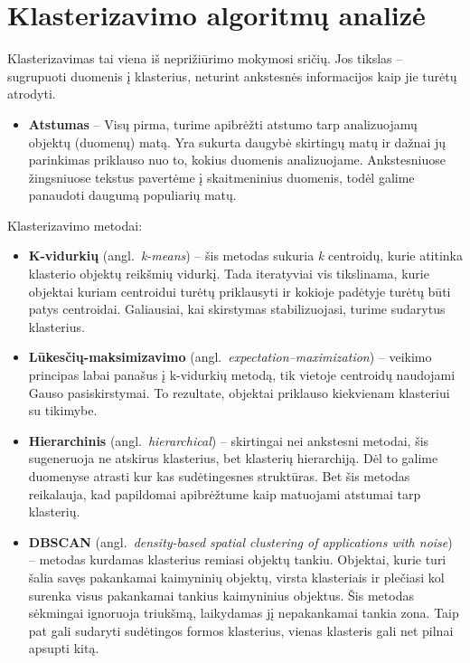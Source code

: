 \documentclass{VUMIFInfKursinis}
\newcommand{\ltang}[2]{#1 (angl.\  \textit{#2}) }
\begin{document}
\section{Klasterizavimo algoritmų analizė}

Klasterizavimas tai viena iš neprižiūrimo mokymosi sričių. Jos tikslas
– sugrupuoti duomenis į klasterius, neturint ankstesnės informacijos
kaip jie turėtų atrodyti.

\begin{itemize}
\item
  \textbf{Atstumas} – Visų pirma, turime apibrėžti atstumo tarp
  analizuojamų objektų (duomenų) matą. Yra sukurta daugybė skirtingų
  matų ir dažnai jų parinkimas priklauso nuo to, kokius duomenis
  analizuojame. Ankstesniuose žingsniuose tekstus pavertėme į
  skaitmeninius duomenis, todėl galime panaudoti daugumą populiarių
  matų.
\end{itemize}

Klasterizavimo metodai:

\begin{itemize}
\item
  \ltang{\textbf{K-vidurkių}}{k-means} – šis metodas sukuria
  \textit{k} centroidų, kurie atitinka klasterio objektų reikšmių vidurkį.
  Tada iteratyviai vis tikslinama, kurie objektai kuriam centroidui
  turėtų priklausyti ir kokioje padėtyje turėtų būti patys centroidai.
  Galiausiai, kai skirstymas stabilizuojasi, turime sudarytus
  klasterius.
\item
  \ltang{\textbf{Lūkesčių-maksimizavimo}}{expectation–maximization} – veikimo principas
  labai panašus į k-vidurkių metodą, tik vietoje centroidų naudojami
  Gauso pasiskirstymai. To rezultate, objektai priklauso kiekvienam
  klasteriui su tikimybe.
\item
  \ltang{\textbf{Hierarchinis}}{hierarchical} – skirtingai nei
  ankstesni metodai, šis sugeneruoja ne atskirus klasterius, bet
  klasterių hierarchiją. Dėl to galime duomenyse atrasti kur kas
  sudėtingesnes struktūras. Bet šis metodas reikalauja, kad papildomai
  apibrėžtume kaip matuojami atstumai tarp klasterių.
\item
  \ltang{\textbf{DBSCAN}}{density-based spatial clustering of
  applications with noise} – metodas kurdamas klasterius remiasi
  objektų tankiu. Objektai, kurie turi šalia savęs pakankamai kaimyninių
  objektų, virsta klasteriais ir plečiasi kol surenka visus pakankamai
  tankius kaimyninius objektus. Šis metodas sėkmingai ignoruoja
  triukšmą, laikydamas jį nepakankamai tankia zona. Taip pat gali
  sudaryti sudėtingos formos klasterius, vienas klasteris gali net
  pilnai apsupti kitą.
\end{itemize}
\end{document}
